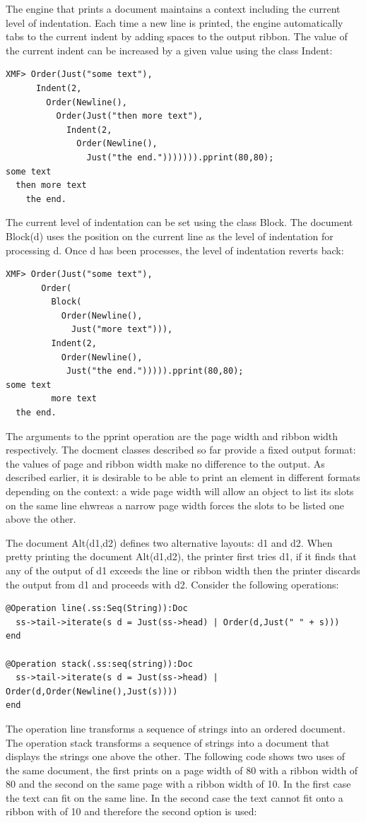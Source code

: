 The engine that prints a document maintains a context including the
current level of indentation. Each time a new line is printed, the
engine automatically tabs to the current indent by adding spaces to
the output ribbon. The value of the current indent can be increased
by a given value using the class Indent:

\begin{lstlisting}
XMF> Order(Just("some text"),
      Indent(2,
        Order(Newline(),         
          Order(Just("then more text"),
            Indent(2,
              Order(Newline(),
                Just("the end."))))))).pprint(80,80);
some text
  then more text
    the end.
\end{lstlisting}The current level of indentation can be set using the class Block.
The document Block(d) uses the position on the current line as the
level of indentation for processing d. Once d has been processes,
the level of indentation reverts back:

\begin{lstlisting}
XMF> Order(Just("some text"),       
       Order(
         Block(
           Order(Newline(),
             Just("more text"))),
         Indent(2,
           Order(Newline(),
            Just("the end."))))).pprint(80,80);
some text
         more text
  the end.
\end{lstlisting}The arguments to the pprint operation are the page width and ribbon
width respectively. The docment classes described so far provide a
fixed output format: the values of page and ribbon width make no difference
to the output. As described earlier, it is desirable to be able to
print an element in different formats depending on the context: a
wide page width will allow an object to list its slots on the same
line ehwreas a narrow page width forces the slots to be listed one
above the other. 

The document Alt(d1,d2) defines two alternative layouts: d1 and d2.
When pretty printing the document Alt(d1,d2), the printer first tries
d1, if it finds that any of the output of d1 exceeds the line or ribbon
width then the printer discards the output from d1 and proceeds with
d2. Consider the following operations:

\begin{lstlisting}
@Operation line(.ss:Seq(String)):Doc
  ss->tail->iterate(s d = Just(ss->head) | Order(d,Just(" " + s)))
end
  
@Operation stack(.ss:seq(string)):Doc
  ss->tail->iterate(s d = Just(ss->head) | Order(d,Order(Newline(),Just(s))))
end
\end{lstlisting}The operation line transforms a sequence of strings into an ordered
document. The operation stack transforms a sequence of strings into
a document that displays the strings one above the other. The following
code shows two uses of the same document, the first prints on a page
width of 80 with a ribbon width of 80 and the second on the same page
with a ribbon width of 10. In the first case the text can fit on the
same line. In the second case the text cannot fit onto a ribbon with
of 10 and therefore the second option is used:

